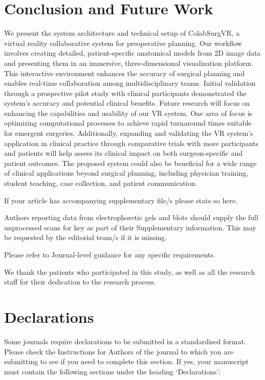 \documentclass[sn-mathphys-num]{sn-jnl}%
\theoremstyle{thmstyleone}%
\theoremstyle{thmstyletwo}%
\theoremstyle{thmstylethree}%
\begin{document}
\section{Conclusion and Future Work}
We present the system architecture and technical setup of ColabSurgVR, a virtual reality collaborative system for preoperative planning. Our workflow involves creating detailed, patient-specific anatomical models from 2D image data and presenting them in an immersive, three-dimensional visualization platform. This interactive environment enhances the accuracy of surgical planning and enables real-time collaboration among multidisciplinary teams. Initial validation through a prospective pilot study with clinical participants demonstrated the system's accuracy and potential clinical benefits.
Future research will focus on enhancing the capabilities and usability of our VR system. One area of focus is optimizing computational processes to achieve rapid turnaround times suitable for emergent surgeries. Additionally, expanding and validating the VR system's application in clinical practice through comparative trials with more participants and patients will help assess its clinical impact on both surgeon-specific and patient outcomes. The proposed system could also be beneficial for a wide range of clinical applications beyond surgical planning, including physician training, student teaching, case collection, and patient communication.

\backmatter


If your article has accompanying supplementary file/s please state so here. 

Authors reporting data from electrophoretic gels and blots should supply the full unprocessed scans for key as part of their Supplementary information. This may be requested by the editorial team/s if it is missing.

Please refer to Journal-level guidance for any specific requirements.


We thank the patients who participated in this study, as well as all the research staff for their dedication to the research process.

\section*{Declarations}

Some journals require declarations to be submitted in a standardised format. Please check the Instructions for Authors of the journal to which you are submitting to see if you need to complete this section. If yes, your manuscript must contain the following sections under the heading `Declarations':
\end{document}
